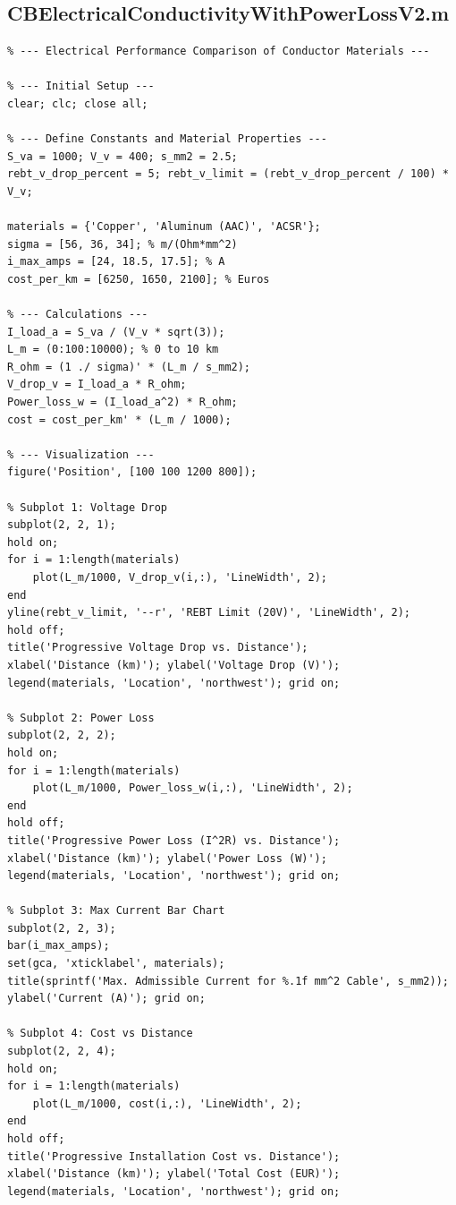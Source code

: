 \documentclass[12pt, a4paper]{article}
\begin{document}
\subsection{CBElectricalConductivityWithPowerLossV2.m}
\begin{lstlisting}
% --- Electrical Performance Comparison of Conductor Materials ---

% --- Initial Setup ---
clear; clc; close all;

% --- Define Constants and Material Properties ---
S_va = 1000; V_v = 400; s_mm2 = 2.5;
rebt_v_drop_percent = 5; rebt_v_limit = (rebt_v_drop_percent / 100) * V_v;

materials = {'Copper', 'Aluminum (AAC)', 'ACSR'};
sigma = [56, 36, 34]; % m/(Ohm*mm^2)
i_max_amps = [24, 18.5, 17.5]; % A
cost_per_km = [6250, 1650, 2100]; % Euros

% --- Calculations ---
I_load_a = S_va / (V_v * sqrt(3));
L_m = (0:100:10000); % 0 to 10 km
R_ohm = (1 ./ sigma)' * (L_m / s_mm2);
V_drop_v = I_load_a * R_ohm;
Power_loss_w = (I_load_a^2) * R_ohm;
cost = cost_per_km' * (L_m / 1000);

% --- Visualization ---
figure('Position', [100 100 1200 800]);

% Subplot 1: Voltage Drop
subplot(2, 2, 1);
hold on;
for i = 1:length(materials)
    plot(L_m/1000, V_drop_v(i,:), 'LineWidth', 2);
end
yline(rebt_v_limit, '--r', 'REBT Limit (20V)', 'LineWidth', 2);
hold off;
title('Progressive Voltage Drop vs. Distance');
xlabel('Distance (km)'); ylabel('Voltage Drop (V)');
legend(materials, 'Location', 'northwest'); grid on;

% Subplot 2: Power Loss
subplot(2, 2, 2);
hold on;
for i = 1:length(materials)
    plot(L_m/1000, Power_loss_w(i,:), 'LineWidth', 2);
end
hold off;
title('Progressive Power Loss (I^2R) vs. Distance');
xlabel('Distance (km)'); ylabel('Power Loss (W)');
legend(materials, 'Location', 'northwest'); grid on;

% Subplot 3: Max Current Bar Chart
subplot(2, 2, 3);
bar(i_max_amps);
set(gca, 'xticklabel', materials);
title(sprintf('Max. Admissible Current for %.1f mm^2 Cable', s_mm2));
ylabel('Current (A)'); grid on;

% Subplot 4: Cost vs Distance
subplot(2, 2, 4);
hold on;
for i = 1:length(materials)
    plot(L_m/1000, cost(i,:), 'LineWidth', 2);
end
hold off;
title('Progressive Installation Cost vs. Distance');
xlabel('Distance (km)'); ylabel('Total Cost (EUR)');
legend(materials, 'Location', 'northwest'); grid on;
\end{lstlisting}
\end{document}
